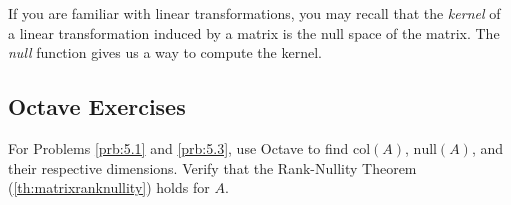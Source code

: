 \documentclass{ximera}
\begin{document}
 
 
 
 
 
 
If you are familiar with linear transformations, you may recall that the \emph{kernel} of a linear transformation induced by a matrix is the null space of the matrix.  The \emph{null} function gives us a way to compute the kernel.
 
\subsection*{Octave Exercises}
For Problems \ref{prb:5.1} and \ref{prb:5.3}, use Octave to find $\text{col}(A)$, $\text{null}(A)$, and their respective dimensions.  Verify that the Rank-Nullity Theorem (\ref{th:matrixranknullity}) holds for $A$.
 
\end{document}
